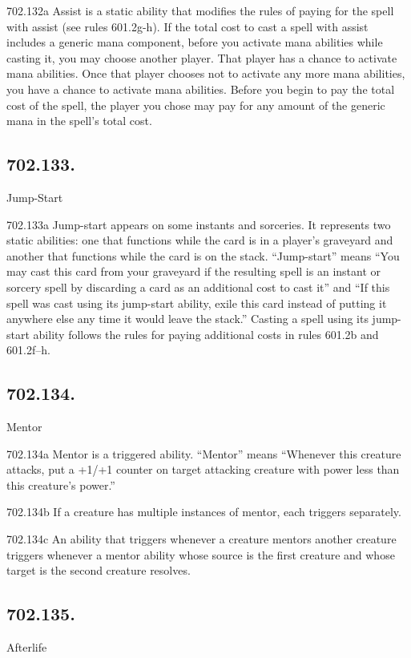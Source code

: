 702.132a Assist is a static ability that modifies the rules of paying for the spell with assist (see rules 601.2g-h). If the total cost to cast a spell with assist includes a generic mana component, before you activate mana abilities while casting it, you may choose another player. That player has a chance to activate mana abilities. Once that player chooses not to activate any more mana abilities, you have a chance to activate mana abilities. Before you begin to pay the total cost of the spell, the player you chose may pay for any amount of the generic mana in the spell’s total cost.

\subsection*{702.133.}
Jump-Start

702.133a Jump-start appears on some instants and sorceries. It represents two static abilities: one that functions while the card is in a player’s graveyard and another that functions while the card is on the stack. “Jump-start” means “You may cast this card from your graveyard if the resulting spell is an instant or sorcery spell by discarding a card as an additional cost to cast it” and “If this spell was cast using its jump-start ability, exile this card instead of putting it anywhere else any time it would leave the stack.” Casting a spell using its jump-start ability follows the rules for paying additional costs in rules 601.2b and 601.2f–h.

\subsection*{702.134.}
Mentor

702.134a Mentor is a triggered ability. “Mentor” means “Whenever this creature attacks, put a +1/+1 counter on target attacking creature with power less than this creature’s power.”

702.134b If a creature has multiple instances of mentor, each triggers separately.

702.134c An ability that triggers whenever a creature mentors another creature triggers whenever a mentor ability whose source is the first creature and whose target is the second creature resolves.

\subsection*{702.135.}
Afterlife

